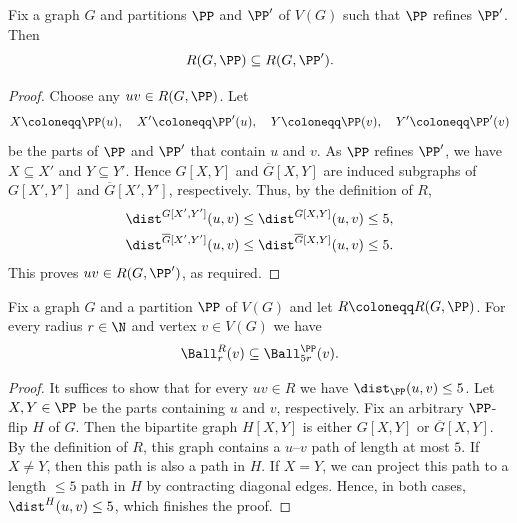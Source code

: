 \begin{lemma}\label{lem:monotoneR}
    Fix a graph $G$ and partitions $\PP$ and $\PP'$ of $V(G)$ such that $\PP$ refines $\PP'$. Then $$R(G,\PP)\subseteq R(G, \PP').$$
\end{lemma}
\begin{proof}
    Choose any $uv \in R(G,\PP)$. Let
    \[
        X \coloneqq \PP(u), \quad
        X' \coloneqq \PP'(u), \quad
        Y \coloneqq \PP(v), \quad
        Y' \coloneqq \PP'(v)
    \]
    be the parts of $\PP$ and $\PP'$ that contain $u$ and $v$.
    As $\PP$ refines $\PP'$, we have $X \subseteq X'$ and $Y \subseteq Y'$.
    Hence $G[X,Y]$ and $\overline G[X,Y]$ are induced subgraphs of $G[X',Y']$ and $\overline G[X',Y']$, respectively.
    Thus, by the definition of $R$,
    \begin{align*}
        \dist^{G[X',Y']}(u,v) &\le \dist^{G[X,Y]}(u,v) \le 5,\\
        \dist^{\overline G[X',Y']}(u,v) &\le \dist^{\overline G[X,Y]}(u,v) \le 5.
    \end{align*}
    This proves $uv \in R(G, \PP')$, as required.
\end{proof}

\begin{lemma}\label{lem:ballContainment}
    Fix a graph $G$ and a partition $\PP$ of $V(G)$ and let $R \coloneqq R(G,\PP)$. For every radius $r \in \N$ and vertex $v \in V(G)$ we have
    \[
        \Ball^R_r(v) \subseteq \Ball^\PP_{5r}(v).
    \]
\end{lemma}

\begin{proof}
    It suffices to show that for every $uv \in R$ we have $\dist_\PP(u,v) \leq 5$.
    Let $X,Y\in\PP$ be the parts containing $u$ and $v$, respectively. Fix an arbitrary $\PP$-flip $H$ of $G$.
    Then the bipartite graph $H[X,Y]$ is either $G[X,Y]$ or $\overline G[X,Y]$.
    By the definition of $R$, this graph contains a $u$--$v$ path of length at most $5$.
    If $X \neq Y$, then this path is also a path in $H$.
    If $X = Y$, we can project this path to a length ${\leq}5$ path in $H$ by contracting diagonal edges. Hence, in both cases,
    $\dist^H(u,v) \leq 5$, which finishes the proof.
\end{proof}

